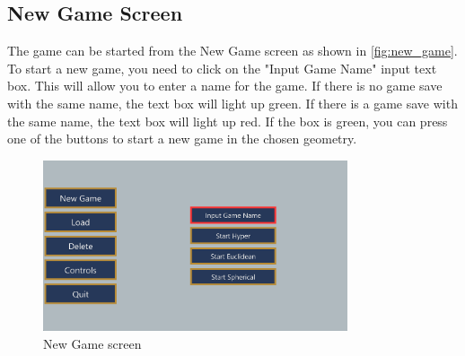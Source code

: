 \subsection{New Game Screen}
The game can be started from the New Game screen as shown in \autoref{fig:new_game}.
To start a new game, you need to click on the "Input Game Name" input text box.
This will allow you to enter a name for the game.
If there is no game save with the same name, the text box will light up green.
If there is a game save with the same name, the text box will light up red.
If the box is green, you can press one of the buttons to start a new game in the chosen geometry.

\begin{figure}[H]
    \centering
    \includegraphics[width=0.8\textwidth]{sections/user_manual/resources/new-game-no-input.png}
    \caption{New Game screen}
    \label{fig:new_game}
\end{figure}